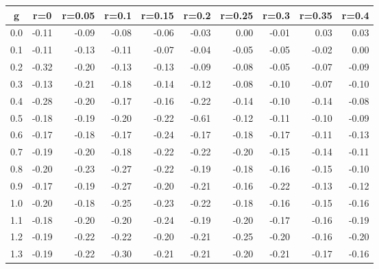 %
\begin{table}[!tbp]
 \begin{center}
 \begin{tabular}{rrrrrrrrrr}\hline\hline
\multicolumn{1}{c}{g}&\multicolumn{1}{c}{r=0}&\multicolumn{1}{c}{r=0.05}&\multicolumn{1}{c}{r=0.1}&\multicolumn{1}{c}{r=0.15}&\multicolumn{1}{c}{r=0.2}&\multicolumn{1}{c}{r=0.25}&\multicolumn{1}{c}{r=0.3}&\multicolumn{1}{c}{r=0.35}&\multicolumn{1}{c}{r=0.4}\tabularnewline
\hline
0.0&-0.11&-0.09&-0.08&-0.06&-0.03& 0.00&-0.01& 0.03& 0.03\tabularnewline
0.1&-0.11&-0.13&-0.11&-0.07&-0.04&-0.05&-0.05&-0.02& 0.00\tabularnewline
0.2&-0.32&-0.20&-0.13&-0.13&-0.09&-0.08&-0.05&-0.07&-0.09\tabularnewline
0.3&-0.13&-0.21&-0.18&-0.14&-0.12&-0.08&-0.10&-0.07&-0.10\tabularnewline
0.4&-0.28&-0.20&-0.17&-0.16&-0.22&-0.14&-0.10&-0.14&-0.08\tabularnewline
0.5&-0.18&-0.19&-0.20&-0.22&-0.61&-0.12&-0.11&-0.10&-0.09\tabularnewline
0.6&-0.17&-0.18&-0.17&-0.24&-0.17&-0.18&-0.17&-0.11&-0.13\tabularnewline
0.7&-0.19&-0.20&-0.18&-0.22&-0.22&-0.20&-0.15&-0.14&-0.11\tabularnewline
0.8&-0.20&-0.23&-0.27&-0.22&-0.19&-0.18&-0.16&-0.15&-0.10\tabularnewline
0.9&-0.17&-0.19&-0.27&-0.20&-0.21&-0.16&-0.22&-0.13&-0.12\tabularnewline
1.0&-0.20&-0.18&-0.25&-0.23&-0.22&-0.18&-0.16&-0.15&-0.16\tabularnewline
1.1&-0.18&-0.20&-0.20&-0.24&-0.19&-0.20&-0.17&-0.16&-0.19\tabularnewline
1.2&-0.19&-0.22&-0.22&-0.20&-0.21&-0.25&-0.20&-0.16&-0.20\tabularnewline
1.3&-0.19&-0.22&-0.30&-0.21&-0.21&-0.20&-0.21&-0.17&-0.16\tabularnewline
\hline
\end{tabular}

\end{center}

\end{table}

